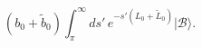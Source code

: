 \begin{equation}
(b_0 +\tilde{b}_0)
\int_{ \pi}^{\infty} ds' \, e^{-s' (L_0+\tilde{L}_0)}
|\mathcal{B}\rangle.
\end{equation}

